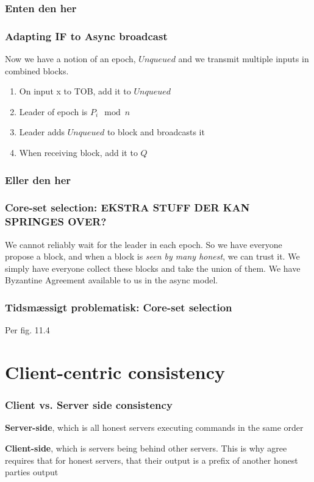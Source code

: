         \subsubsection{Enten den her}
            \begin{frame}
                \frametitle{Adapting IF to Async broadcast}
                    Now we have a notion of an epoch, $Unqueued$ and we transmit multiple inputs in combined blocks. 
                    \begin{enumerate}
                        \item On input x to TOB, add it to $Unqueued$
                        \item Leader of epoch is $P_i \mod n$ 
                        \item Leader adds $Unqueued$ to block and broadcasts it
                        \item When receiving block, add it to $Q$
                    \end{enumerate}
            \end{frame}
        \subsubsection{Eller den her}
            \begin{frame}
                \frametitle{Core-set selection: EKSTRA STUFF DER KAN SPRINGES OVER?}
                    We cannot reliably wait for the leader in each epoch. So we have everyone propose a block, and when a block is \textit{seen by many honest}, we can trust it. We simply have everyone collect these blocks and take the union of them. We have Byzantine Agreement available to us in the async model. 
            \end{frame}
            \begin{frame}
                \frametitle{Tidsmæssigt problematisk: Core-set selection}
                    Per fig. 11.4
                
            \end{frame}

\section{Client-centric consistency}
    \begin{frame}
        \frametitle{Client vs. Server side consistency}
        \textbf{Server-side}, which is all honest servers executing commands in the same order
        
        \textbf{Client-side}, which is servers being behind other servers. This is why agree requires that for honest servers, that their output is a prefix of another honest parties output
    \end{frame}






